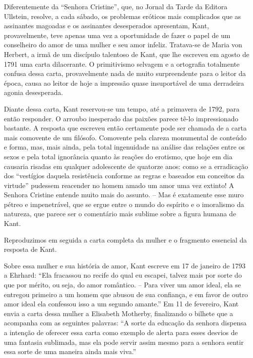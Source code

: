 Diferentemente da ``Senhora Cristine'', que, no Jornal da Tarde da
Editora Ullstein, resolve, a cada sábado, os problemas eróticos mais
complicados que as assinantes magoadas e os assinantes desesperados
apresentam, Kant, provavelmente, teve apenas uma vez a oportunidade de
fazer o papel de um conselheiro do amor de uma mulher e seu amor
infeliz. Tratava-se de Maria von Herbert, a irmã de um discípulo
talentoso de Kant, que lhe escreveu em agosto de 1791 uma carta
dilacerante. O primitivismo selvagem e a ortografia totalmente confusa
dessa carta, provavelmente nada de muito surpreendente para o leitor da
época, causa ao leitor de hoje a impressão quase insuportável de uma
derradeira agonia desesperada.

Diante dessa carta, Kant reservou-se um tempo, até a primavera de 1792,
para então responder. O arroubo inesperado das paixões parece tê-lo
impressionado bastante. A resposta que escreveu então certamente pode
ser chamada de a carta mais comovente de um filósofo. Comovente pela
clareza monumental de conteúdo e forma, mas, mais ainda, pela total
ingenuidade na análise das relações entre os sexos e pela total
ignorância quanto às reações do erotismo, que hoje em dia causaria
risadas em qualquer adolescente de quatorze anos: como se a erradicação
dos ``vestígios daquela resistência conforme as regras e baseados em
conceitos da virtude'' pudessem reacender no homem amado um amor uma vez
extinto! A Senhora Cristine entende muito mais do assunto. -- Mas é
exatamente esse muro pétreo e impenetrável, que se ergue entre o mundo
do espírito e o imoralismo da natureza, que parece ser o comentário mais
sublime sobre a figura humana de Kant.

Reproduzimos em seguida a carta completa da mulher e o fragmento
essencial da resposta de Kant.

Sobre essa mulher e sua história de amor, Kant escreve em 17 de janeiro
de 1793 a Ehrhard: ``Ela fracassou no recife do qual eu escapei, talvez
mais por sorte do que por mérito, ou seja, do amor romântico. -- Para
viver um amor ideal, ela se entregou primeiro a um homem que abusou de
sua confiança, e em favor de outro amor ideal ela confessou isso a um
segundo amante.'' Em 11 de fevereiro, Kant envia a carta dessa mulher a
Elisabeth Motherby, finalizando o bilhete que a acompanha com as
seguintes palavras: ``A sorte da educação da senhora dispensa a intenção
de oferecer essa carta como exemplo de alerta para esses desvios de uma
fantasia sublimada, mas ela pode servir assim mesmo para a senhora
sentir essa sorte de uma maneira ainda mais viva.''

